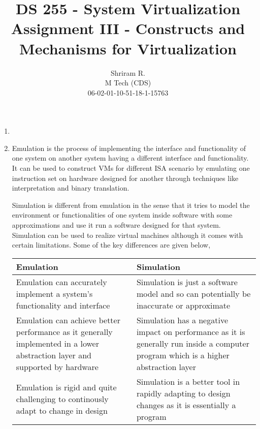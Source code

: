 \documentclass[11pt,a4paper,oneside]{article}
\begin{document}
	\title{DS 255 - System Virtualization \\ Assignment III - Constructs and Mechanisms for Virtualization}
	\author{Shriram R. \\ M Tech (CDS) \\ 06-02-01-10-51-18-1-15763}
	\maketitle	
	
	\begin{enumerate}
		\item
		\item Emulation is the process of implementing the interface and functionality of one system on another system having a different interface and functionality. It can be used to construct VMs for different ISA scenario by emulating one instruction set on hardware designed for another through techniques like interpretation and binary translation.
		
		Simulation is different from emulation in the sense that it tries to model the environment or functionalities of one system inside software with some approximations and use it run a software designed for that system. Simulation can be used to realize virtual machines although it comes with certain limitations. Some of the key differences are given below,
		
		\begin{center}
			\begin{tabular}{|p{6cm}|p{6cm}|}
				\hline 
				\textbf{Emulation}  & \textbf{Simulation} \\
				\hline
				Emulation can accurately implement a system's functionality and interface & Simulation is just a software model and so can potentially be inaccurate or approximate\\
				\hline
				Emulation can achieve better performance as it generally implemented in a lower abstraction layer and supported by hardware & Simulation has a negative impact on performance as it is generally run inside a computer program which is a higher abstraction layer\\
				\hline 
				Emulation is rigid and quite challenging to continously adapt to change in design & Simulation is a better tool in rapidly adapting to design changes as it is essentially a program \\ 
				\hline
				\end{tabular}
		\end{center}	
		

\end{enumerate}
\end{document}
